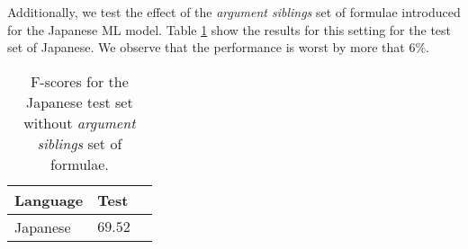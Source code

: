 Additionally, we test the effect of the \emph{argument siblings} set of formulae 
introduced for the Japanese ML model. Table \ref{tbl:japanese} show the results 
for this setting for the test set of Japanese. We observe that the performance is 
worst by more that $6\%$.

\begin{table}
\begin{center}
\small
\begin{tabular}{|l|l|l|}\hline
Language           & Test      \\\hline\hline
Japanese           & $69.52$     \\ %
\hline
\end{tabular}
\caption{F-scores for the Japanese test set without \emph{argument siblings} set 
of formulae.}
\label{tbl:japanese}
\normalsize
\end{center}
\end{table}






